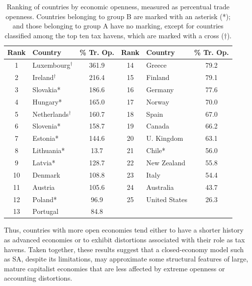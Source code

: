 \documentclass[12pt]{article}
\begin{document}
\begin{table}[h!]
\centering
\begin{tabular}{clc|clc}
Rank & Country                 & \% Tr. Op.   & Rank & Country        & \% Tr. Op.  \\
\hline
1       & Luxembourg$^{\dagger}$  & 361.9       & 14      & Greece         & 79.2        \\
2       & Ireland$^{\dagger}$     & 216.4       & 15      & Finland        & 79.1        \\
3       & Slovakia*               & 186.6       & 16      & Germany        & 77.6        \\
4       & Hungary*                & 165.0       & 17      & Norway         & 70.0        \\
5       & Netherlands$^{\dagger}$ & 160.7       & 18      & Spain          & 67.0        \\
6       & Slovenia*               & 158.7       & 19      & Canada         & 66.2        \\
7       & Estonia*                & 144.6       & 20      & U. Kingdom      & 63.1        \\
8       & Lithuania*              & 13.7        & 21      & Chile*          & 56.0        \\
9       & Latvia*                 & 128.7       & 22      & New Zealand     & 55.8      \\
10      & Denmark                 & 108.8       & 23      & Italy           &  54.4     \\
11      & Austria                 & 105.6       & 24      & Australia       & 43.7      \\
12      & Poland*                 & 96.9        & 25      & United States   &  26.3\\
13      & Portugal                & 84.8        &   &      &              
\end{tabular}
\caption{Ranking of countries by economic openness, measured as percentual trade openness. Countries belonging to group B are marked with an asterisk (*); and those belonging to group A have no marking, except for countries classified among the top ten tax havens, which are marked with a cross ($\dagger$).}
\label{table:all2}
\end{table}

Thus, countries with more open economies tend either to have a shorter history as advanced economies or to exhibit distortions associated with their role as tax havens. Taken together, these results suggest that a closed-economy model such as SA, despite its limitations, may approximate some structural features of large, mature capitalist economies that are less affected by extreme openness or accounting distortions.
\end{document}
